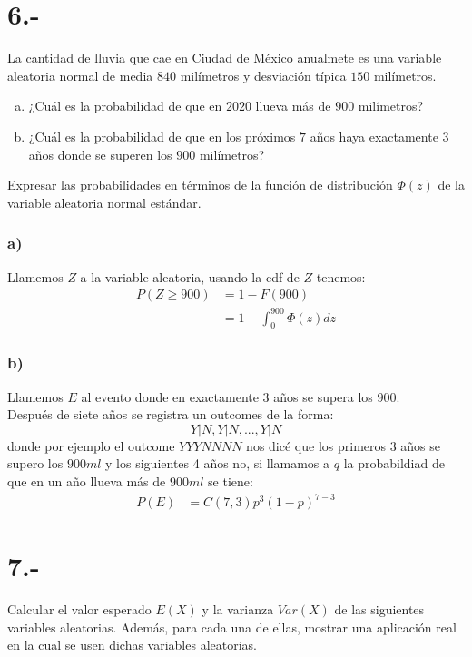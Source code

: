 \documentclass{article}
\begin{document}
\section*{6.-}
La cantidad de lluvia que cae en Ciudad de México anualmete es una variable aleatoria normal de media $840$ milímetros y desviación típica $150$ milímetros.
\begin{enumerate}[a)]
    \item ¿Cuál es la probabilidad de que en $2020$ llueva más de $900$ milímetros?
    \item ¿Cuál es la probabilidad de que en los próximos $7$ años haya exactamente $3$ años 
    donde se superen los $900$ milímetros?
\end{enumerate}
Expresar las probabilidades en términos de la función de distribución $\Phi(z)$ de la variable aleatoria 
normal estándar.
\begin{tcolorbox}[breakable]
    \subsubsection*{a)}
    Llamemos $Z$ a la variable aleatoria, usando la cdf de $Z$ tenemos:
    \begin{align*}
        P(Z \geq 900) 
        &= 1-F(900) \\
        &= 1-\int_0^{900} \Phi(z)dz
    \end{align*} 
    \subsubsection*{b)}
    Llamemos $E$ al evento donde en exactamente 3 años se supera los $900$. \\
    Después de siete años se registra un outcomes de la forma:
    \[ Y|N,Y|N,...,Y|N \]
    donde por ejemplo el outcome $YYYNNNN$ nos dicé que los primeros 3 años se supero 
    los $900ml$ y los siguientes 4 años no, si llamamos a $q$ la probabildiad de que en un año llueva más de $900ml$
    se tiene:
    \begin{align*}
        P(E) &= C(7,3)p^3(1-p)^{7-3}
    \end{align*}
\end{tcolorbox}

\section*{7.-}
Calcular el valor esperado $E(X)$ y la varianza $Var(X)$ de las siguientes variables aleatorias. Además, para cada una de ellas, mostrar una aplicación  
real en la cual se usen dichas variables aleatorias.
\end{document}
